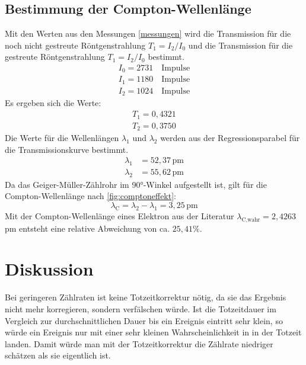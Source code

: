 \documentclass[titlepage = firstcover]{scrartcl}
\begin{document}
      \subsection{Bestimmung der Compton-Wellenlänge}
        Mit den Werten aus den Messungen \ref{messungen} wird die Transmission für die noch nicht gestreute Röntgenstrahlung $T_1 = I_2 / I_0$ und die Transmission für die gestreute Röntgenstrahlung $T_1 = I_2 / I_0$ bestimmt.
        \begin{align*}
          I_0 = 2731 \quad \text{Impulse}\\
          I_1 = 1180 \quad \text{Impulse}\\
          I_2 = 1024 \quad \text{Impulse}
        \end{align*}
        Es ergeben sich die Werte:
        \begin{align*}
          T_1 = 0,4321\\
          T_2 = 0,3750
        \end{align*}
        Die Werte für die Wellenlängen $\lambda_1$ und $\lambda_2$ werden aus der Regressionsparabel für die Transmissionskurve bestimmt.
        \begin{align*}
          \lambda_1 &= 52,37 \, \text{pm}\\
          \lambda_2 &= 55,62 \, \text{pm}
        \end{align*}
        Da das Geiger-Müller-Zählrohr im 90°-Winkel aufgestellt ist, gilt für die Compton-Wellenlänge nach \ref{fig:comptoneffekt}:
        \begin{equation*}
          \lambda_\text{C} = \lambda_2 - \lambda_1 = 3,25 \, \text{pm}
        \end{equation*}
        Mit der Compton-Wellenlänge eines Elektron aus der Literatur $\lambda_\text{C,wahr} = 2,4263$ pm entsteht eine relative Abweichung von ca. $25,41\%$.

      \section{Diskussion}
        Bei geringeren Zählraten ist keine Totzeitkorrektur nötig, da sie das Ergebnis nicht mehr korregieren, sondern verfälschen würde. Ist die Totzeitdauer im Vergleich zur durchschnittlichen Dauer bis ein Ereignis eintritt sehr klein, so würde ein Ereignis nur mit einer sehr kleinen Wahrscheinlichkeit in in der Totzeit landen. Damit würde man mit der Totzeitkorrektur die Zählrate niedriger schätzen als sie eigentlich ist.
\end{document}
